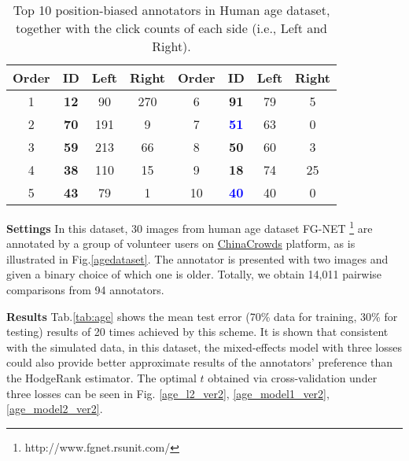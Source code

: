 \documentclass[10pt,journal,cspaper,compsoc]{IEEEtran}
\begin{document}
{{\renewcommand\baselinestretch{1.2}\selectfont
\setlength{\belowcaptionskip}{3pt}
\begin{table}[h]\caption{\label{tab:ageposition} Top 10 position-biased annotators in Human age dataset, together with the click counts of each side (i.e., Left and Right).}
\tiny
\centering
\newsavebox{\tablebox}
\begin{lrbox}{\tablebox}
\begin{tabular}{||c|c|c|c||c|c|c|c||}
  \hline  \textbf{Order} &\textbf{ID}   &\textbf{Left}  &\textbf{Right} & \textbf{Order} & \textbf{ID}   &\textbf{Left}  &\textbf{Right} \\
 \hline
\hline    1 & \textbf{12}	&90	&270  & 6 & \textbf{91}	&79	&5\\
\hline   2 & \textbf{70}	&191	&9 & 7 & \textcolor{blue}{\textbf{51}}	&63	&0\\
\hline    3 & \textbf{59}	&213	&66 & 8 & \textbf{50}	&60	&3 \\
\hline    4 & \textbf{38}	&110 &15  & 9 &\textbf{18}	&74	&25 \\
\hline    5 & \textbf{43}   &79 & 1 & 10 & \textcolor{blue}{\textbf{40}}	&40	&0   \\

\hline
\end{tabular}
\medskip
\end{lrbox}
\scalebox{1}{\usebox{\tablebox}}
\end{table}
\par}


\textbf{Settings} In this dataset, 30 images from human age dataset FG-NET \footnote{http://www.fgnet.rsunit.com/} are annotated by a group of volunteer users on \href{http://www.chinacrowds.com/}{ChinaCrowds} platform, as is illustrated in Fig.\ref{agedataset}. The annotator is presented with two images and
given a binary choice of which one is older. Totally, we obtain 14,011 pairwise comparisons from 94 annotators.

\textbf{Results} Tab.\ref{tab:age} shows the mean test error (70\% data for training, 30\% for testing)
results of 20 times achieved by this scheme. It is shown that consistent with the simulated data, in this dataset, the mixed-effects model with three losses could also provide
better approximate results of the annotators' preference than the HodgeRank estimator.
The optimal $t$ obtained via cross-validation under three losses can be seen in 
Fig. \ref{age_l2_ver2}, \ref{age_model1_ver2}, \ref{age_model2_ver2}.

}
\end{document}
